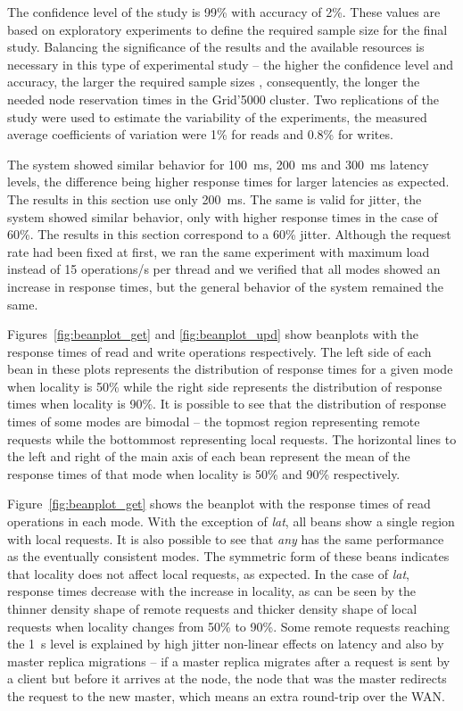 \documentclass[man,floatsintext,12pt]{apa6}
\begin{document}
The confidence level of the study is 99\% with accuracy of 2\%. These values
are based on exploratory experiments to define the required sample size for the
final study. Balancing the significance of the results and the available
resources is necessary in this type of experimental study -- the higher the
confidence level and accuracy, the larger the required sample sizes
\parencite{Jain1991}, consequently, the longer the needed node reservation
times in the Grid'5000 cluster. Two replications of the study were used to
estimate the variability of the experiments, the measured average coefficients
of variation were 1\% for reads and 0.8\% for writes.

The system showed similar behavior for 100~ms, 200~ms and 300~ms latency
levels, the difference being higher response times for larger latencies as
expected. The results in this section use only 200~ms. The same is valid for
jitter, the system showed similar behavior, only with higher response times in
the case of 60\%. The results in this section correspond to a 60\% jitter.
Although the request rate had been fixed at first, we ran the same experiment
with maximum load instead of 15 operations/s per thread and we verified that
all modes showed an increase in response times, but the general behavior of the
system remained the same.

Figures~\ref{fig:beanplot_get} and \ref{fig:beanplot_upd} show beanplots
with the response times of read and write operations respectively. The left
side of each bean in these plots represents the distribution of response times
for a given mode when locality is 50\% while the right side represents the
distribution of response times when locality is 90\%. It is possible to see
that the distribution of response times of some modes are bimodal -- the
topmost region representing remote requests while the bottommost representing
local requests. The horizontal lines to the left and right of the main axis of
each bean represent the mean of the response times of that mode when locality
is 50\% and 90\% respectively.

Figure~\ref{fig:beanplot_get} shows the beanplot with the response times of
read operations in each mode. With the exception of \textit{lat}, all beans
show a single region with local requests. It is also possible to see that
\textit{any} has the same performance as the eventually consistent modes. The
symmetric form of these beans indicates that locality does not affect local
requests, as expected. In the case of \textit{lat}, response times decrease
with the increase in locality, as can be seen by the thinner density shape of
remote requests and thicker density shape of local requests when locality
changes from 50\% to 90\%. Some remote requests reaching the 1~s level is
explained by high jitter non-linear effects on latency and also by master
replica migrations -- if a master replica migrates after a request is sent by a
client but before it arrives at the node, the node that was the master
redirects the request to the new master, which means an extra round-trip over
the WAN.
\end{document}
